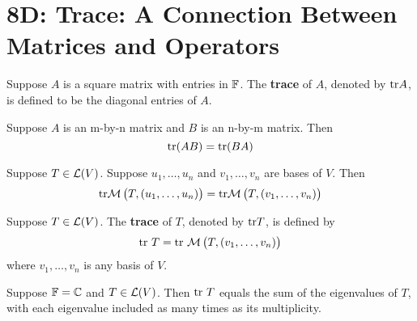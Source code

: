 \documentclass{extarticle}
\begin{document}


\newpage 
\section*{8D: Trace: A Connection Between Matrices and Operators}

\begin{definition}
    Suppose \(A\) is a square matrix with entries in \(\mathbb{F}\). The \textbf{trace} of \(A\), denoted by 
    \(\text{tr} A\), is defined to be the diagonal entries of \(A\).
\end{definition}

\begin{proposition}
    Suppose \(A\) is an m-by-n matrix and \(B\) is an n-by-m matrix. Then 
    \[\text{tr} (AB) = \text{tr} (BA)\]
\end{proposition}

\begin{lemma}
    Suppose \(T \in \mathcal{L}(V)\). Suppose \(u_1, \ldots, u_n\) and \(v_1, \ldots, v_n\) are bases of \(V\). Then 
    \[\text{tr} \mathcal{M} \left( T, \left( u_1, \ldots, u_n \right) \right) 
    = \text{tr} \mathcal{M} \left( T, \left( v_1, \ldots, v_n \right) \right)\]
\end{lemma}

\begin{definition}
    Suppose \(T \in \mathcal{L}(V)\). The \textbf{trace} of \(T\), denoted by \(\text{tr} T\), is defined by 
    \[\text{tr} \ T = \text{tr} \ \mathcal{M} \left( T, \left( v_1, \ldots, v_n \right) \right)\]
    where \(v_1, \ldots, v_n\) is any basis of \(V\).
\end{definition}

\begin{corollary}
    Suppose \(\mathbb{F} = \mathbb{C}\) and \(T \in \mathcal{L}(V)\). Then \(\text{tr} \ T\) equals the sum of the eigenvalues of \(T\), with 
    each eigenvalue included as many times as its multiplicity. 
\end{corollary}
\end{document}
